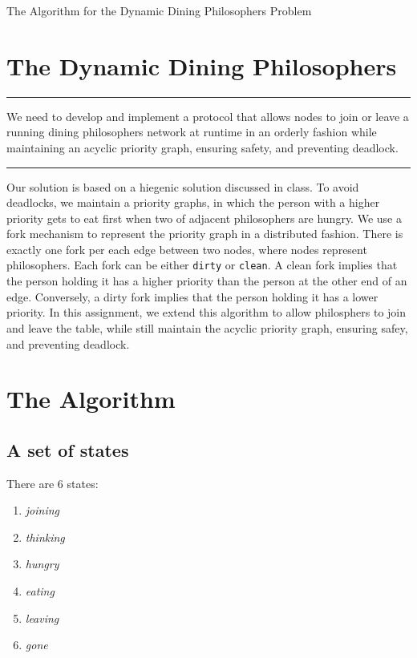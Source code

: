 \documentclass[11pt]{article}
\newenvironment{problem}[1]{
\medskip \hrule \medskip
\noindent {\bf Problem #1.}
}{
\medskip \hrule \medskip
}
\begin{document}
\pagestyle{fancy}


\vspace*{0.1in}
\begin{center} \Large The Algorithm for the Dynamic Dining Philosophers Problem \end{center}

\section{The Dynamic Dining Philosophers}
\begin{problem}{Statement}
We need to develop and implement a protocol that allows nodes to join or leave a running dining philosophers network at runtime in an orderly fashion while maintaining an acyclic priority graph, ensuring safety, and preventing deadlock.
\end{problem}

Our solution is based on a hiegenic solution discussed in class. To avoid deadlocks, we maintain a priority graphs, in which the person with a higher priority gets to eat first when two of adjacent philosophers are hungry. We use a fork mechanism to represent the priority graph in a distributed fashion. There is exactly one fork per each edge between two nodes, where nodes represent philosophers. Each fork can be either \texttt{dirty} or \texttt{clean}. A clean fork implies that the person holding it has a higher priority than the person at the other end of an edge. Conversely, a dirty fork implies that the person holding it has a lower priority. In this assignment, we extend this algorithm to allow philosphers to join and leave the table, while still maintain the acyclic priority graph, ensuring safey, and preventing deadlock.


\section{The Algorithm}
\subsection{A set of states}
There are 6 states:
\begin{enumerate}
\item \textit{joining}
\item \textit{thinking}
\item \textit{hungry}
\item \textit{eating}
\item \textit{leaving}
\item \textit{gone}
\end{enumerate}
\end{document}
